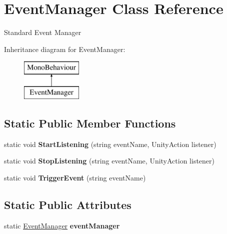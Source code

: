 \hypertarget{class_event_manager}{}\section{Event\+Manager Class Reference}
\label{class_event_manager}


Standard Event Manager  


Inheritance diagram for Event\+Manager\+:\begin{figure}[H]
\begin{center}
\leavevmode
\includegraphics[height=2.000000cm]{class_event_manager}
\end{center}
\end{figure}
\subsection*{Static Public Member Functions}
\begin{DoxyCompactItemize}
\item 
\mbox{\label{class_event_manager_a0bbc4d6c0420fd5c4cd108da486ec3f5}} 
static void {\bfseries Start\+Listening} (string event\+Name, Unity\+Action listener)
\item 
\mbox{\label{class_event_manager_a4dd92dc8fc89cfec873035c852de9d29}} 
static void {\bfseries Stop\+Listening} (string event\+Name, Unity\+Action listener)
\item 
\mbox{\label{class_event_manager_a41b32d95b222220546f131806504c8ac}} 
static void {\bfseries Trigger\+Event} (string event\+Name)
\end{DoxyCompactItemize}
\subsection*{Static Public Attributes}
\begin{DoxyCompactItemize}
\item 
\mbox{\label{class_event_manager_a8d0d8ab42da1ba97f200f912f76e2c52}} 
static \hyperlink{class_event_manager}{Event\+Manager} {\bfseries event\+Manager}
\end{DoxyCompactItemize}
